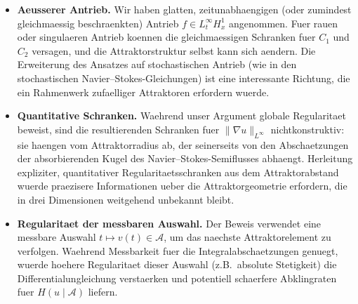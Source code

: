 \documentclass[12pt,a4paper]{article}
\theoremstyle{definition}
\theoremstyle{plain}
\theoremstyle{remark}
\begin{document}
\begin{itemize}
    \item \textbf{Aeusserer Antrieb.} Wir haben glatten, zeitunabhaengigen (oder zumindest gleichmaessig beschraenkten) Antrieb $f \in L^\infty_t H^1_x$ angenommen. Fuer rauen oder singulaeren Antrieb koennen die gleichmaessigen Schranken fuer $C_1$ und $C_2$ versagen, und die Attraktorstruktur selbst kann sich aendern. Die Erweiterung des Ansatzes auf stochastischen Antrieb (wie in den stochastischen Navier--Stokes-Gleichungen) ist eine interessante Richtung, die ein Rahmenwerk zufaelliger Attraktoren erfordern wuerde.

    \item \textbf{Quantitative Schranken.} Waehrend unser Argument globale Regularitaet beweist, sind die resultierenden Schranken fuer $\|\nabla u\|_{L^\infty}$ nichtkonstruktiv: sie haengen vom Attraktorradius ab, der seinerseits von den Abschaetzungen der absorbierenden Kugel des Navier--Stokes-Semiflusses abhaengt. Herleitung expliziter, quantitativer Regularitaetsschranken aus dem Attraktorabstand wuerde praezisere Informationen ueber die Attraktorgeometrie erfordern, die in drei Dimensionen weitgehend unbekannt bleibt.

    \item \textbf{Regularitaet der messbaren Auswahl.} Der Beweis verwendet eine messbare Auswahl $t \mapsto v(t) \in \mathcal{A}$, um das naechste Attraktorelement zu verfolgen. Waehrend Messbarkeit fuer die Integralabschaetzungen genuegt, wuerde hoehere Regularitaet dieser Auswahl (z.B.\ absolute Stetigkeit) die Differentialungleichung verstaerken und potentiell schaerfere Abklingraten fuer $H(u \mid \mathcal{A})$ liefern.
\end{itemize}
\end{document}
